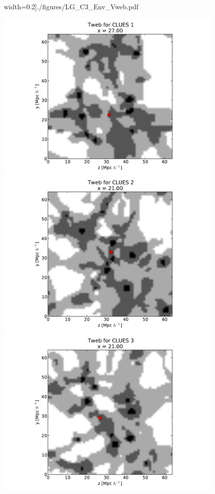 \documentclass[usenatbib]{latex/mn2e}
\begin{document}
\begin{figure}
\begin{center}
width=0.2\textheight]{./figures/LG_C3_Env_Vweb.pdf}

\includegraphics[trim = 30mm 0mm 35mm 0mm, clip, keepaspectratio=true,
width=0.2\textheight]{./figures/LG_C1_Env_Tweb.pdf}
\includegraphics[trim = 30mm 0mm 35mm 0mm, clip, keepaspectratio=true,
width=0.2\textheight]{./figures/LG_C2_Env_Tweb.pdf}
\includegraphics[trim = 30mm 0mm 35mm 0mm, clip, keepaspectratio=true,
width=0.2\textheight]{./figures/LG_C3_Env_Tweb.pdf}


\end{center}
\end{figure}
\end{document}

